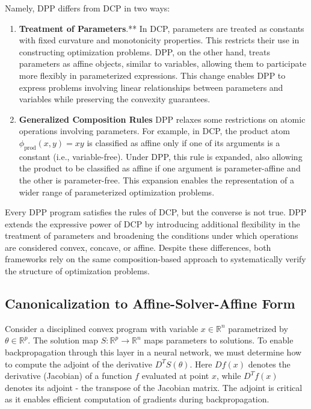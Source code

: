 \documentclass{article}
\begin{document}
Namely, DPP differs from DCP in two ways:

\begin{enumerate}
    \item \textbf{Treatment of Parameters}.** In DCP, parameters are treated as constants with fixed curvature and monotonicity properties. This restricts their use in constructing optimization problems. DPP, on the other hand, treats parameters as affine objects, similar to variables, allowing them to participate more flexibly in parameterized expressions. This change enables DPP to express problems involving linear relationships between parameters and variables while preserving the convexity guarantees.
    \item  \textbf{Generalized Composition Rules} DPP relaxes some restrictions on atomic operations involving parameters. For example, in DCP, the product atom \(\phi_{\text{prod}}(x, y) = xy\) is classified as affine only if one of its arguments is a constant (i.e., variable-free). Under DPP, this rule is expanded, also allowing the product to be classified as affine if one argument is parameter-affine and the other is parameter-free. This expansion enables the representation of a wider range of parameterized optimization problems.
\end{enumerate}

Every DPP program satisfies the rules of DCP, but the converse is not true. DPP extends the expressive power of DCP by introducing additional flexibility in the treatment of parameters and broadening the conditions under which operations are considered convex, concave, or affine. Despite these differences, both frameworks rely on the same composition-based approach to systematically verify the structure of optimization problems.

\subsection{Canonicalization to Affine-Solver-Affine Form}

Consider a disciplined convex program with variable $x \in \mathbb{R}^n$ parametrized by $\theta \in \mathbb{R}^p$. The solution map $S: \mathbb{R}^p \to \mathbb{R}^n$ maps parameters to solutions. To enable backpropagation through this layer in a neural network, we must determine how to compute the adjoint of the derivative $D^T S(\theta)$. Here $Df(x)$ denotes the derivative (Jacobian) of a function $f$ evaluated at point $x$, while $D^T f(x)$ denotes its adjoint - the transpose of the Jacobian matrix. The adjoint is critical as it enables efficient computation of gradients during backpropagation.
\end{document}
